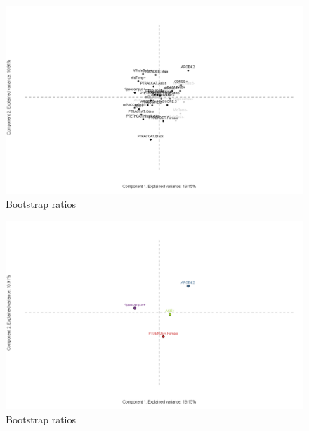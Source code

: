 \documentclass[
  ignorenonframetext,
]{beamer}
\begin{document}
\begin{frame}

\begin{figure}
\centering
\includegraphics{../Images/boot2.png}
\caption{Bootstrap ratios}
\end{figure}

\end{frame}

\begin{frame}

\begin{figure}
\centering
\includegraphics{../Images/boot3.png}
\caption{Bootstrap ratios}
\end{figure}

\end{frame}
\end{document}
